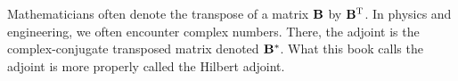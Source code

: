 \par
Mathematicians often denote the transpose of a matrix
$\bold B$ by $\bold B^{\rm T}$.
In physics and engineering, we often encounter complex numbers.
There, the adjoint is the complex-conjugate transposed matrix
denoted $\bold B^\ast$.
What this book calls the adjoint is more properly called the Hilbert adjoint.

%


